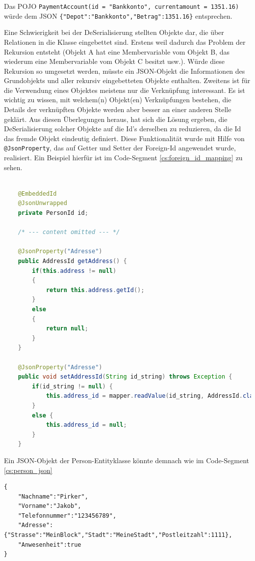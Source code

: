 Das POJO \verb|PaymentAccount(id = "Bankkonto", currentamount = 1351.16)| würde \newline dem JSON \verb|{"Depot":"Bankkonto","Betrag":1351.16}| entsprechen.


Eine Schwierigkeit bei der DeSerialisierung stellten Objekte dar, die über Relationen in die Klasse eingebettet sind. Erstens weil dadurch das Problem der Rekursion entsteht (Objekt A hat eine Membervariable vom Objekt B, das wiederum eine Membervariable vom Objekt C besitzt usw.). Würde diese Rekursion so umgesetzt werden, müsste ein JSON-Objekt die Informationen des Grundobjekts und aller rekursiv eingebetteten Objekte enthalten. Zweitens ist für die Verwendung eines Objektes meistens nur die Verknüpfung interessant. Es ist wichtig zu wissen, mit welchem(n) Objekt(en) Verknüpfungen bestehen, die Details der verknüpften Objekte werden aber besser an einer anderen Stelle geklärt. Aus diesen Überlegungen heraus, hat sich die Lösung ergeben, die DeSerialisierung solcher Objekte auf die Id's derselben zu reduzieren, da die Id das fremde Objekt eindeutig definiert. Diese Funktionalität wurde mit Hilfe von \verb|@JsonProperty|, das auf Getter und Setter der Foreign-Id angewendet wurde, realisiert. Ein Beispiel hierfür ist im Code-Segment \ref{cs:foreign_id_mapping} zu sehen.

\footnotesize
\begin{lstlisting}[caption=Foreign-Id mapping für die Address-Entity in Person.java, label=cs:foreign_id_mapping, language=Java]

	@EmbeddedId
	@JsonUnwrapped
	private PersonId id;
	
	/* --- content omitted --- */
	
	@JsonProperty("Adresse")
	public AddressId getAddress() {
	   	if(this.address != null)
	   	{
	   		return this.address.getId();
	   	}
	   	else
	   	{
	   		return null;
	   	}
	}
	
	@JsonProperty("Adresse")
	public void setAddressId(String id_string) throws Exception {
	   	if(id_string != null) {
	   		this.address_id = mapper.readValue(id_string, AddressId.class);
	   	}
	   	else {
	   		this.address_id = null;
	   	}
	}
\end{lstlisting}
\normalsize

Ein JSON-Objekt der Person-Entityklasse könnte demnach wie im Code-Segment \ref{cs:person_json}

\footnotesize
\begin{lstlisting}[label = cs:person_json, caption = Beispiel für ein Serialisiertes JSON-Objekt]
{	
	"Nachname":"Pirker",
	"Vorname":"Jakob",
	"Telefonnummer":"123456789",
	"Adresse":{"Strasse":"MeinBlock","Stadt":"MeineStadt","Postleitzahl":1111},
	"Anwesenheit":true
}
\end{lstlisting}
\normalsize

